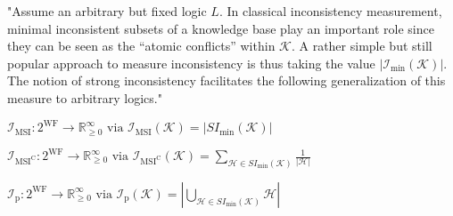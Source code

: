 "Assume an arbitrary but fixed logic \(L\). In classical inconsistency measurement, minimal inconsistent subsets of a knowledge base play an important role since they can be seen as the “atomic conflicts” within \(\mathcal{K}\). A rather simple but still popular approach to measure inconsistency is thus taking the value \(\left| \mathcal{I}_{\min}(\mathcal{K}) \right|\). The notion of strong inconsistency facilitates the following generalization of this measure to arbitrary logics."

\(\mathcal{I}_{\text{MSI}}: 2^{\text{WF}} \rightarrow \mathbb{R}_{\geq 0}^{\infty} \text{ via } \mathcal{I}_{\text{MSI}}(\mathcal{K}) = \left| SI_{\min}(\mathcal{K}) \right|\)

\(\mathcal{I}_{\text{MSI}^\text{C}}: 2^{\text{WF}} \rightarrow \mathbb{R}_{\geq 0}^{\infty} \text{ via } \mathcal{I}_{\text{MSI}^\text{C}}(\mathcal{K}) = \sum_{\mathcal{H} \in SI_{\min}(\mathcal{K})} \frac{1}{|\mathcal{H}|}\)
\cite{hunter_measuring_2008}

\(\mathcal{I}_{\text{p}}: 2^{\text{WF}} \rightarrow \mathbb{R}_{\geq 0}^{\infty} \text{ via } \mathcal{I}_{\text{p}}(\mathcal{K}) = \left| \bigcup_{\mathcal{H} \in SI_{\min}(\mathcal{K})} \mathcal{H} \right|\)
\cite{liu_measuring_2011}
